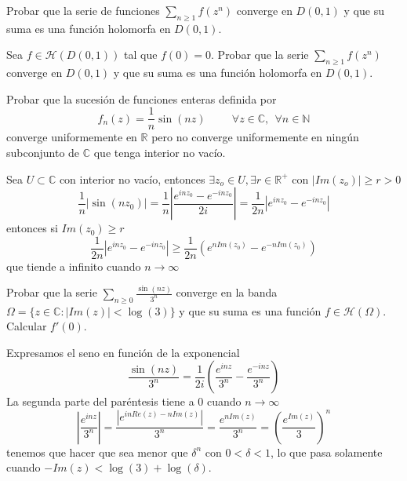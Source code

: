 \begin{ejer}
	Probar que la serie de funciones $\sum_{n\geq 1} f(z^n)$ converge en $D(0,1)$ y que su suma es una función holomorfa en $D(0,1)$.
\end{ejer}

\begin{ejer}
	Sea $f\in\mathcal{H}(D(0,1))$ tal que $f(0)=0$.
	Probar que la serie $\sum_{n\geq 1}f(z^n)$ converge en $D(0,1)$ y que su suma es una función holomorfa en $D(0,1)$.
\end{ejer}

\begin{ejer}
	Probar que la sucesión de funciones enteras definida por
	$$ f_n(z) = \frac{1}{n}\sin(nz) \hspace{1cm} \forall z\in\mathbb{C}, \ \ \forall n\in\mathbb{N} $$
	converge uniformemente en $\mathbb{R}$ pero no converge uniformemente en ningún subconjunto de $\mathbb{C}$ que tenga interior no vacío.
\end{ejer}
\begin{sol}
	Sea $U\subset \mathbb{C}$ con interior no vacío, entonces $\exists z_o\in U, \exists r\in\mathbb{R}^+$ con $|Im(z_o)| \geq r > 0$
	$$\frac{1}{n}|\sin(nz_0)| = \frac{1}{n}\left| \frac{e^{inz_0}-e^{-inz_0}}{2i} \right|= \frac{1}{2n} \left| e^{inz_0} - e^{-inz_0} \right|$$
	entonces si $Im(z_0)\geq r$
	$$\frac{1}{2n} \left| e^{inz_0} - e^{-inz_0} \right|  \geq \frac{1}{2n} \left( e^{nIm(z_0)} -e^{-nIm(z_0)} \right)  $$
	que tiende a infinito cuando $n\rightarrow\infty$
\end{sol}

\begin{ejer}
	Probar que la serie $\sum_{n\geq 0} \frac{\sin(nz)}{3^n}$ converge en la banda $\Omega = \{ z\in\mathbb{C} : |Im(z)|<\log(3) \}$ y que su suma es una función $f\in\mathcal{H}(\Omega)$. Calcular $f'(0)$.
\end{ejer}
\begin{sol}
	Expresamos el seno en función de la exponencial
	$$\frac{\sin(nz)}{3^n} = \frac{1}{2i} \left( \frac{e^{inz}}{3^n} - \frac{e^{-inz}}{3^n} \right)$$
	La segunda parte del paréntesis tiene a 0 cuando $n\rightarrow \infty$
	$$\left| \frac{e^{inz}}{3^n} \right| = \frac{|e^{inRe(z)-nIm(z)}|}{3^n} =
	\frac{e^{nIm(z)}}{3^n} = 
	\left( \frac{e^{Im(z)}}{3} \right)^n$$
	tenemos que hacer que sea menor que $\delta^n$ con $0<\delta<1$, lo que pasa solamente cuando $-Im(z) < \log(3)+\log(\delta)$. 
\end{sol}

